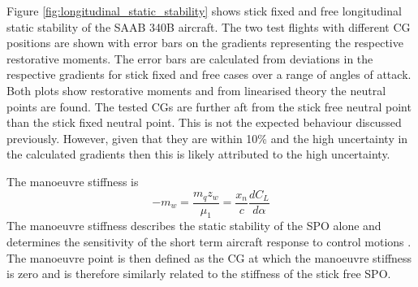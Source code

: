 \documentclass{article}
\begin{document}
Figure \ref{fig:longitudinal_static_stability} shows stick fixed and free longitudinal static stability of the SAAB 340B aircraft.
The two test flights with different CG positions are shown with error bars on the gradients representing the respective restorative moments.
The error bars are calculated from deviations in the respective gradients for stick fixed and free cases over a range of angles of attack.
Both plots show restorative moments and from linearised theory the neutral points are found.
The tested CGs are further aft from the stick free neutral point than the stick fixed neutral point.
This is not the expected behaviour discussed previously.
However, given that they are within 10\% and the high uncertainty in the calculated gradients then this is likely attributed to the high uncertainty.


The manoeuvre stiffness is 
\begin{equation}
    -m_w = \frac{m_q z_w}{\mu_1} = \frac{x_n}{c}\frac{dC_L}{d\alpha} 
\end{equation}
The manoeuvre stiffness describes the static stability of the SPO alone and determines the sensitivity of the short term aircraft response to control motions \cite{notes}.
The manoeuvre point is then defined as the CG at which the manoeuvre stiffness is zero and is therefore similarly related to the stiffness of the stick free SPO.
\end{document}
